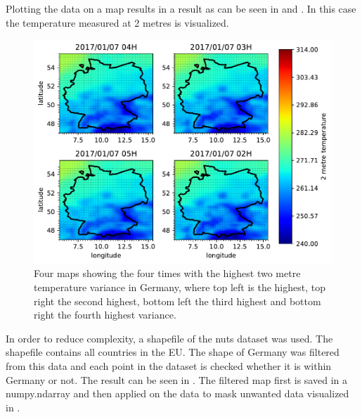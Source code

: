 Plotting the data on a map results in a result as can be seen in  and . In this case the temperature measured at 2 metres is visualized.\\


\begin{figure}[h!]%
\centering
\includegraphics[width=\textwidth]{plots/t2m/bundles/maxvar4_maps}%
\caption{Four maps showing the four times with the highest two metre temperature variance in Germany, where top left is the highest, top right the second highest, bottom left the third highest and bottom right the fourth highest variance.}%
\label{fig:maxvar4_maps}%
\end{figure}

In order to reduce complexity, a shapefile of the \acrshort{nuts} dataset was used. The shapefile contains all countries in the EU. The shape of Germany was filtered from this data and each point in the dataset is checked whether it is within Germany or not. The result can be seen in . The filtered map first is saved in a numpy.ndarray and then applied on the data to mask unwanted data visualized in .\\

